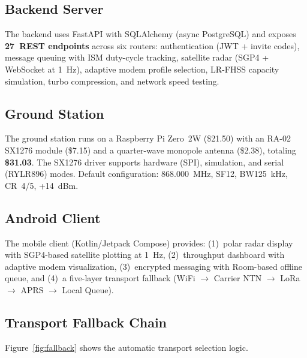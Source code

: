 \documentclass[11pt,a4paper]{article}
\begin{document}
\subsection{Backend Server}

The backend uses FastAPI with SQLAlchemy (async PostgreSQL) and exposes \textbf{27~REST endpoints} across six routers: authentication (JWT + invite codes), message queuing with ISM duty-cycle tracking, satellite radar (SGP4 + WebSocket at 1~Hz), adaptive modem profile selection, LR-FHSS capacity simulation, turbo compression, and network speed testing.

\subsection{Ground Station}

The ground station runs on a Raspberry Pi Zero~2W (\$21.50) with an RA-02 SX1276 module (\$7.15) and a quarter-wave monopole antenna (\$2.38), totaling \textbf{\$31.03}. The SX1276 driver supports hardware (SPI), simulation, and serial (RYLR896) modes. Default configuration: 868.000~MHz, SF12, BW125~kHz, CR~4/5, +14~dBm.

\subsection{Android Client}

The mobile client (Kotlin/Jetpack Compose) provides: (1)~polar radar display with SGP4-based satellite plotting at 1~Hz, (2)~throughput dashboard with adaptive modem visualization, (3)~encrypted messaging with Room-based offline queue, and (4)~a five-layer transport fallback (WiFi $\rightarrow$ Carrier NTN $\rightarrow$ LoRa $\rightarrow$ APRS $\rightarrow$ Local Queue).

\subsection{Transport Fallback Chain}

Figure~\ref{fig:fallback} shows the automatic transport selection logic.
\end{document}
